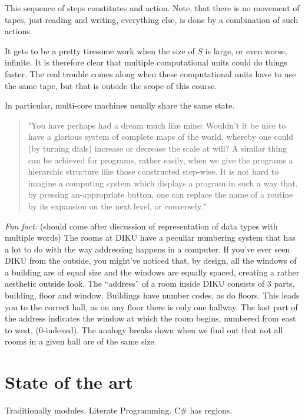 This sequence of steps constitutes and action. Note, that there is no movement
of tapes, just reading and writing, everything else, is done by a combination
of such actions.


It gets to be a pretty tiresome work when the size of
$S$ is large, or even worse, infinite. It is therefore clear that multiple computational
units could do things faster. The real trouble comes along when these
computational units have to use the same tape, but that is outside the scope of
this course.

In particular, multi-core machines usually share the same state.




\begin{quote}"You have perhaps had a dream much like mine: Wouldn't it be nice
to have a glorious system of complete maps of the world, whereby one could (by
turning dials) increase or decrease the scale at will? A similar thing can be
achieved for programs, rather easily, when we give the programs a hierarchic
structure like those constructed step-wise. It is not hard to imagine a
computing system which displays a program in such a way that, by pressing
an-appropriate button, one can replace the name of a routine by its expansion
on the next level, or conversely."\cite{knuth-review-of-sp}\end{quote}

\emph{Fun fact:} (should come after discussion of representation of data types
with multiple words) The rooms at DIKU have a peculiar numbering system that
has a lot to do with the way addressing happens in a computer. If you've ever
seen DIKU from the outside, you might've noticed that, by design, all the
windows of a building are of equal size and the windows are equally spaced,
creating a rather aesthetic outside look. The ``address'' of a room inside DIKU
consists of 3 parts, building, floor and window. Buildings have number codes,
as do floors. This leads you to the correct hall, as on any floor there is only
one hallway. The last part of the address indicates the window at which the
room begins, numbered from east to west, (0-indexed). The analogy breaks down
when we find out that not all rooms in a given hall are of the same size.



\section{State of the art}

Traditionally modules. Literate Programming. C\# has regions.


